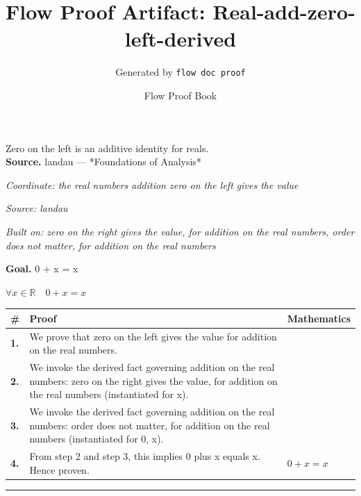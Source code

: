 \documentclass[11pt]{article}
\title{Flow Proof Artifact: Real-add-zero-left-derived}
\author{Generated by \texttt{flow doc proof}}
\date{Flow Proof Book}
\theoremstyle{definition}
\begin{document}
\maketitle
Zero on the left is an additive identity for reals.\\[0.5em]
\textbf{Source.} landau — *Foundations of Analysis*\\[0.5em]
\bigskip
{}\par
\smallskip\noindent\textit{Coordinate: the real numbers \cdot addition \cdot zero on the left gives the value}\par
\smallskip\noindent\textit{Source: landau}\par
\smallskip\noindent\textit{Built on: zero on the right gives the value, for addition on the real numbers, order does not matter, for addition on the real numbers}\par
\medskip
\noindent\textbf{Goal.} 0 + x = x\par
\noindent$\displaystyle \forall x \in \mathbb{R}\quad 0 + x = x$\par
\medskip
\noindent
\begin{tabular}{@{} >{\raggedright\arraybackslash}p{} >{\raggedright\arraybackslash}p{} >{\raggedleft\arraybackslash}p{} @{}}
\textbf{\#} & \textbf{Proof} & \textbf{Mathematics} \\
\midrule
\textbf{1.} & We prove that zero on the left gives the value for addition on the real numbers. & \\[0.45em]
\textbf{2.} & We invoke the derived fact governing addition on the real numbers: zero on the right gives the value, for addition on the real numbers (instantiated for x). & \\[0.45em]
\textbf{3.} & We invoke the derived fact governing addition on the real numbers: order does not matter, for addition on the real numbers (instantiated for 0, x). & \\[0.45em]
\textbf{4.} & From step 2 and step 3, this implies 0 plus x equals x. Hence proven. & $\displaystyle 0 + x = x$ \\[0.45em]
\bottomrule
\end{tabular}
\label{thm:Real-addition-zero_on_the_left_gives_the_value}
\par\medskip\hrule
\end{document}
